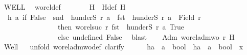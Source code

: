 \begin{isabellebody}
\ WELL{\isacharprime}{\kern0pt}\ \isamarkupfalse%
\ wo{\isacharunderscore}{\kern0pt}rel{\isacharunderscore}{\kern0pt}def\ \isacommand{{\isachardot}{\kern0pt}}\isamarkupfalse%
\isanewline
\ \ \isanewline
\ \ \isamarkupfalse%
\ H\ \ H{\isacharunderscore}{\kern0pt}def{\isacharcolon}{\kern0pt}\ {\isachardoublequoteopen}H\ {\isacharequal}{\kern0pt}\isanewline
\ \ {\isacharparenleft}{\kern0pt}{\isasymlambda}h\ a{\isachardot}{\kern0pt}\ if\ False\ {\isasymnotin}\ {\isacharparenleft}{\kern0pt}snd\ {\isasymcirc}\ h{\isacharparenright}{\kern0pt}{\isacharbackquote}{\kern0pt}{\isacharparenleft}{\kern0pt}underS\ r\ a{\isacharparenright}{\kern0pt}\ {\isasymand}\ {\isacharparenleft}{\kern0pt}fst\ {\isasymcirc}\ h{\isacharparenright}{\kern0pt}{\isacharbackquote}{\kern0pt}{\isacharparenleft}{\kern0pt}underS\ r\ a{\isacharparenright}{\kern0pt}\ {\isasymnoteq}\ Field\ r{\isacharprime}{\kern0pt}\isanewline
\ \ \ \ \ \ \ \ \ \ \ \ \ \ \ \ then\ {\isacharparenleft}{\kern0pt}wo{\isacharunderscore}{\kern0pt}rel{\isachardot}{\kern0pt}suc\ r{\isacharprime}{\kern0pt}\ {\isacharparenleft}{\kern0pt}{\isacharparenleft}{\kern0pt}fst\ {\isasymcirc}\ h{\isacharparenright}{\kern0pt}{\isacharbackquote}{\kern0pt}{\isacharparenleft}{\kern0pt}underS\ r\ a{\isacharparenright}{\kern0pt}{\isacharparenright}{\kern0pt}{\isacharcomma}{\kern0pt}\ True{\isacharparenright}{\kern0pt}\isanewline
\ \ \ \ \ \ \ \ \ \ \ \ \ \ \ \ else\ {\isacharparenleft}{\kern0pt}undefined{\isacharcomma}{\kern0pt}\ False{\isacharparenright}{\kern0pt}{\isacharparenright}{\kern0pt}{\isachardoublequoteclose}\ \isamarkupfalse%
\ blast\isanewline
\ \ \isamarkupfalse%
\ Adm{\isacharcolon}{\kern0pt}\ {\isachardoublequoteopen}wo{\isacharunderscore}{\kern0pt}rel{\isachardot}{\kern0pt}adm{\isacharunderscore}{\kern0pt}wo\ r\ H{\isachardoublequoteclose}\isanewline
\ \ \isamarkupfalse%
\ Well\isanewline
\ \ \isamarkupfalse%
{\isacharparenleft}{\kern0pt}unfold\ wo{\isacharunderscore}{\kern0pt}rel{\isachardot}{\kern0pt}adm{\isacharunderscore}{\kern0pt}wo{\isacharunderscore}{\kern0pt}def{\isacharcomma}{\kern0pt}\ clarify{\isacharparenright}{\kern0pt}\isanewline
\ \ \ \ \isamarkupfalse%
\ h{}{\isacharcolon}{\kern0pt}{\isacharcolon}{\kern0pt}{\isachardoublequoteopen}{\isacharprime}{\kern0pt}a\ {\isasymRightarrow}\ {\isacharprime}{\kern0pt}a{\isacharprime}{\kern0pt}\ {\isacharasterisk}{\kern0pt}\ bool{\isachardoublequoteclose}\ \ h{}{\isacharcolon}{\kern0pt}{\isacharcolon}{\kern0pt}{\isachardoublequoteopen}{\isacharprime}{\kern0pt}a\ {\isasymRightarrow}\ {\isacharprime}{\kern0pt}a{\isacharprime}{\kern0pt}\ {\isacharasterisk}{\kern0pt}\ bool{\isachardoublequoteclose}\ \ x\isanewline

\end{isabellebody}
